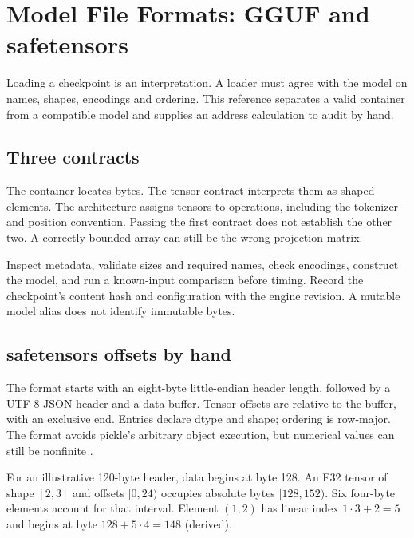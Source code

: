 \chapter{Model File Formats: GGUF and safetensors}\label{app:formats}
\begin{ChapterIntent}
Loading a checkpoint is an interpretation. A loader must agree with the
model on names, shapes, encodings and ordering. This reference separates a
valid container from a compatible model and supplies an address calculation
to audit by hand.
\end{ChapterIntent}

\section{Three contracts}
The container locates bytes. The tensor contract interprets them as shaped
elements. The architecture assigns tensors to operations, including the
tokenizer and position convention. Passing the first contract does not
establish the other two. A correctly bounded array can still be the wrong
projection matrix.

Inspect metadata, validate sizes and required names, check encodings,
construct the model, and run a known-input comparison before timing.
Record the checkpoint's content hash and configuration with the engine
revision. A mutable model alias does not identify immutable bytes.

\section{safetensors offsets by hand}
The format starts with an eight-byte little-endian header length, followed
by a UTF-8 JSON header and a data buffer. Tensor offsets are relative to
the buffer, with an exclusive end. Entries declare dtype and shape;
ordering is row-major. The format avoids pickle's arbitrary object
execution, but numerical values can still be nonfinite
\cite{safetensors2026format}.

For an illustrative 120-byte header, data begins at byte 128.
An F32 tensor of shape $[2,3]$ and offsets $[0,24)$ occupies absolute
bytes $[128,152)$. Six four-byte elements account for that interval.
Element $(1,2)$ has linear index $1\cdot3+2=5$ and begins at byte
$128+5\cdot4=148$ (derived).


